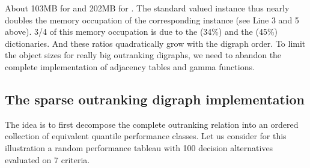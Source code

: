 \documentclass[a4paper,10pt,english]{sphinxhowto}
\begin{document}
\begin{sphinxVerbatim}[commandchars=\\\{\},numbers=left,firstnumber=1,stepnumber=1]
\end{sphinxVerbatim}

About 103MB for  and 202MB for . The standard  valued  instance  thus nearly doubles the memory occupation of the corresponding   instance (see Line 3 and 5 above). 3/4 of this memory occupation is due to the  (34\%) and the  (45\%) dictionaries. And these ratios quadratically grow with the digraph order. To limit the object sizes for really big outranking digraphs, we need to abandon the complete implementation of adjacency tables and gamma functions.


\subsection{The sparse outranking digraph implementation}
\label{\detokenize{tutorial:the-sparse-outranking-digraph-implementation}}
The idea is to first decompose the complete outranking relation into an ordered collection of equivalent quantile performance classes. Let us consider for this illustration a random performance tableau with 100 decision alternatives evaluated on 7 criteria.

\begin{sphinxVerbatim}[commandchars=\\\{\},numbers=left,firstnumber=1,stepnumber=1]
   
  
                              
\end{sphinxVerbatim}
\end{document}
